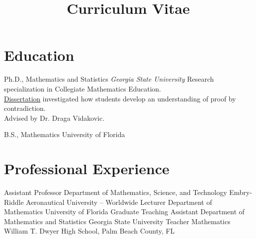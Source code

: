 \documentclass[10pt,a4paper,sans]{moderncv}
\title{Curriculum Vitae}
\begin{document}
\makecvtitle
\vspace*{-2cm}
\section{Education}
	{Ph.D., Mathematics and Statistics}
	{}{}
	{\textit{Georgia State University}}
	{ Research specialization in Collegiate Mathematics Education. \\ 
	\href{https://scholarworks.gsu.edu/math_diss/46/}{\underline{Dissertation}} investigated how students develop an understanding of proof by contradiction. \\ Advised by Dr. Draga Vidakovic.}
	{}
	
	{B.S., Mathematics}
	{University of Florida}
	{}{}{}

\section{Professional Experience}
	{Assistant Professor}
	{}
	{Department of Mathematics, Science, and Technology}
	{Embry-Riddle Aeronautical University -- Worldwide}
	{}
	{Lecturer}
	{}
	{Department of Mathematics}
	{University of Florida}
	{}
	{Graduate Teaching Assistant}
	{}
	{Department of Mathematics and Statistics}
	{Georgia State University}
	{}
	{Teacher}
	{}
	{Mathematics}
	{William T. Dwyer High School, Palm Beach County, FL}
	{} 
\end{document}
